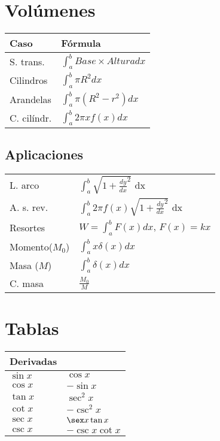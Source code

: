 \documentclass[11pt]{article}
\begin{document}
\section{Volúmenes}
\label{sec-3}
\begin{center}
\begin{tabular}{ll}
Caso & Fórmula\\
\hline
S. trans. & $\int_{a}^{b} Base \times Altura dx$\\
Cilindros & $\int_{a}^{b}\pi R^2 dx$\\
Arandelas & $\int_{a}^{b}\pi(R^2 - r^2) dx$\\
C. cilíndr. & $\int_{a}^{b}2\pi x f(x)  dx$\\
\end{tabular}
\end{center}

\subsection{Aplicaciones}
\label{sec-3-1}

\begin{center}
\begin{tabular}{ll}
L. arco & $\int_{a}^{b} \sqrt{1 + \frac{dy}{dx}^2}$ dx\\
A. s. rev. & $\int_{a}^{b} 2\pi f(x) \sqrt{1 + \frac{dy}{dx}^2}$ dx\\
Resortes & $W = \int_{a}^{b} F(x)dx$, $F(x)=kx$\\
Momento($M_{0}$) & $\int_{a}^{b}x\delta(x)dx$\\
Masa ($M$) & $\int_{a}^{b}\delta(x)dx$\\
C. masa & $\frac{M_{0}}{M}$\\
\end{tabular}
\end{center}



\section{Tablas}
\label{sec-4}

\begin{center}
\begin{tabular}{ll}
Derivadas & \\
\hline
$\sin x$ & $\cos x$\\
$\cos x$ & $-\sin x$\\
$\tan x$ & $\sec^2 x$\\
$\cot x$ & $-\csc^2 x$\\
$\sec x$ & $\sex x \tan x$\\
$\csc x$ & $-\csc x \cot x$\\
\end{tabular}
\end{center}
\end{document}
